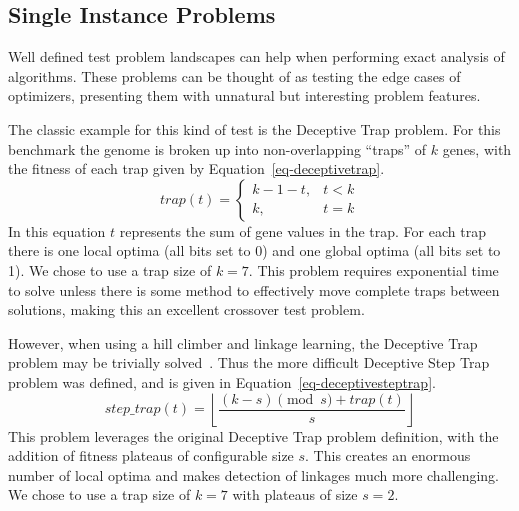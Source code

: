 \documentclass{sig-alternate}
\begin{document}
\begin{comment}
In practice it is often more important to find a good solution quickly than find
the best solution after an exceedingly high number of evaluations.  However, even
a cursory consideration of P3's operators should convince one of its ability to
find high quality solutions in very few evaluations.  This is specifically true of the iterative
application of the first improvement hill climber and the exceptionally elitist
crossover operator.  Therefore we feel it is more important to test P3's resistance
to premature convergence, as that seems a more likely flaw than being slow to reach
``good enough'' solutions.
\end{comment}

\subsection{Single Instance Problems}
Well defined test problem landscapes can help when performing exact analysis of
algorithms.  These problems can be thought of as testing the edge cases of optimizers,
presenting them with unnatural but interesting problem features.

The classic example for this kind of test is the Deceptive Trap problem.
For this benchmark the genome is broken up into non-overlapping ``traps'' of $k$
genes, with the fitness of each trap given by Equation~\ref{eq-deceptivetrap}.
\begin{equation}
   trap(t) = \left\{
     \begin{array}{rl}
       k-1-t, &  t<k\\
       k,   &  t = k
     \end{array}
   \right.
  \label{eq-deceptivetrap}
\end{equation}
In this equation $t$ represents the sum of gene values in the trap.  For each trap
there is one local optima (all bits set to 0) and one global optima (all bits set to 1).
We chose to use a trap size of $k=7$.
This problem requires exponential time to solve unless there is some method to effectively
move complete traps between solutions, making this an excellent crossover test problem.

However, when using a hill climber and linkage learning, the Deceptive Trap problem
may be trivially solved~\cite{goldman:2012:ltga}.  Thus the more
difficult Deceptive Step Trap
problem was defined, and is given in Equation~\ref{eq-deceptivesteptrap}.
\begin{equation}
   step\_trap(t) = \left \lfloor \frac{(k-s)\pmod{s} + trap(t)}{s} \right \rfloor
  \label{eq-deceptivesteptrap}
\end{equation}
This problem leverages the original Deceptive Trap problem definition, with the
addition of fitness plateaus of configurable size $s$.  This creates an enormous
number of local optima and makes detection of linkages much more challenging.  We
chose to use a trap size of $k=7$ with plateaus of size $s=2$.
\end{document}
